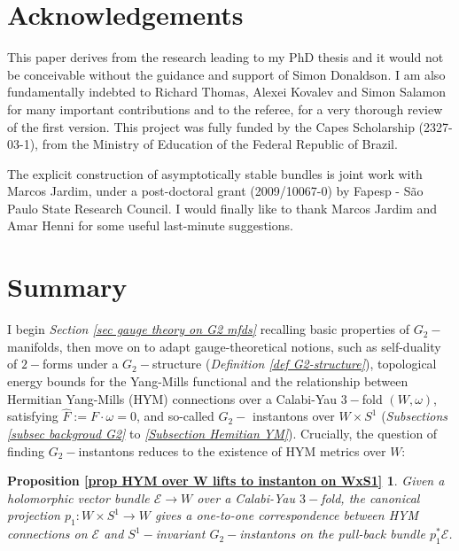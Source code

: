 \documentclass{article}
\newcommand{\mc}[1]{\mathcal{#1}}
\begin{document}
\setcounter{section}{0}
\section*{Acknowledgements}

This paper derives from the research leading to my PhD thesis and it would not be conceivable without the guidance and support of Simon Donaldson.
I am also fundamentally indebted to Richard Thomas, Alexei Kovalev and Simon Salamon for many important contributions and to the referee, for a very thorough review of the first version. This project was fully funded by the Capes Scholarship (2327-03-1),
 from the Ministry of Education of the Federal Republic of Brazil.

The explicit construction of asymptotically stable bundles is joint work with Marcos Jardim, under a post-doctoral grant (2009/10067-0) by Fapesp - S\~ao Paulo State Research Council. I would finally like to thank Marcos Jardim and Amar Henni for some useful last-minute suggestions.



\setcounter{section}{0}
\section*{Summary}

I begin \emph{Section \ref{sec gauge theory on G2 mfds}} recalling basic properties of $G_{2}-$%
manifolds, then move on to adapt gauge-theoretical notions, such as self-duality of $2-$forms under  a $G_2-$structure (\emph{Definition \ref{def G2-structure}}),
topological energy bounds for the Yang-Mills functional and the relationship
between Hermitian Yang-Mills (HYM) connections over a Calabi-Yau $3-$fold $(W,\omega)$,  satisfying $\hat F:=F\cdot\omega=0$,  and so-called $G_{2}-$%
instantons over $W\times S^{1}$ (\emph{Subsections \ref{subsec backgroud G2}} to \emph{\ref{Subsection Hemitian YM}}).
Crucially, the question of finding $G_2-$instantons reduces to the existence of HYM metrics over $W$:

\newtheorem*{prop:G2-HYM}
        {Proposition \ref{prop HYM over W lifts to instanton on WxS1} }
\begin{prop:G2-HYM}
Given a holomorphic vector bundle  $\mathcal{E}\rightarrow W$ over  a Calabi-Yau $3-$fold, the canonical projection $p_1:W\times S^1\to W$ gives a one-to-one correspondence between HYM connections on $\mc{E}$ and $S^1-$invariant $G_{2}-$instantons
on the pull-back bundle $p_1^*\mathcal{E}$.
\end{prop:G2-HYM}
\end{document}
